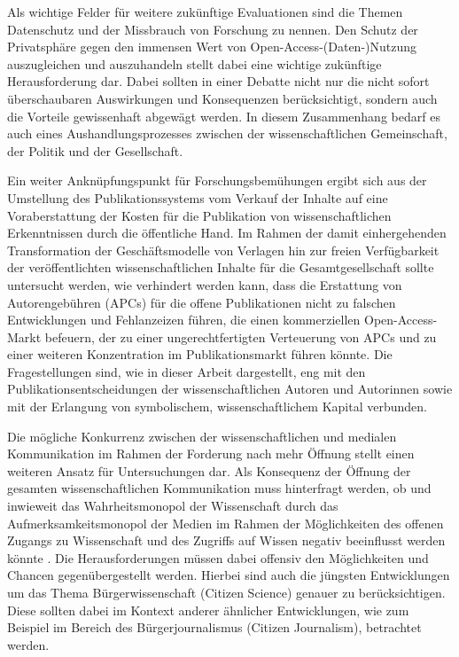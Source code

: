 Als wichtige Felder für weitere zukünftige Evaluationen sind die Themen Datenschutz und der Missbrauch von Forschung \cite{Fritsch_2015} zu nennen. Den Schutz der Privatsphäre gegen den immensen Wert von Open-Access-(Daten-)Nutzung auszugleichen und auszuhandeln stellt dabei eine wichtige zukünftige Herausforderung dar. Dabei sollten in einer Debatte nicht nur die nicht sofort überschaubaren Auswirkungen und Konsequenzen berücksichtigt, sondern auch die Vorteile gewissenhaft abgewägt werden. In diesem Zusammenhang bedarf es auch eines Aushandlungsprozesses zwischen der wissenschaftlichen Gemeinschaft, der Politik und der Gesellschaft.

Ein weiter Anknüpfungspunkt für Forschungsbemühungen ergibt sich aus der Umstellung des Publikationssystems vom Verkauf der Inhalte auf eine Voraberstattung der Kosten für die Publikation von wissenschaftlichen Erkenntnissen durch die öffentliche Hand. Im Rahmen der damit einhergehenden Transformation der Geschäftsmodelle von Verlagen hin zur freien Verfügbarkeit der veröffentlichten wissenschaftlichen Inhalte für die Gesamtgesellschaft sollte untersucht werden, wie verhindert werden kann, dass die Erstattung von Autorengebühren (APCs) für die offene Publikationen nicht zu falschen Entwicklungen und Fehlanzeizen führen, die einen kommerziellen Open-Access-Markt befeuern, der zu einer ungerechtfertigten Verteuerung von APCs und zu einer weiteren Konzentration im Publikationsmarkt führen könnte. Die Fragestellungen sind, wie in dieser Arbeit dargestellt, eng mit den Publikationsentscheidungen der wissenschaftlichen Autoren und Autorinnen sowie mit der Erlangung von symbolischem, wissenschaftlichem Kapital verbunden.

Die mögliche Konkurrenz zwischen der wissenschaftlichen und medialen Kommunikation im Rahmen der Forderung nach mehr Öffnung stellt einen weiteren Ansatz für Untersuchungen dar. Als Konsequenz der Öffnung der gesamten wissenschaftlichen Kommunikation muss hinterfragt werden, ob und inwieweit das Wahrheitsmonopol der Wissenschaft durch das Aufmerksamkeitsmonopol der Medien im Rahmen der Möglichkeiten des offenen Zugangs zu Wissenschaft und des Zugriffs auf Wissen negativ beeinflusst werden könnte \cite{Weingart_2005}. Die Herausforderungen müssen dabei offensiv den Möglichkeiten und Chancen gegenübergestellt werden. Hierbei sind auch die jüngsten Entwicklungen um das Thema Bürgerwissenschaft (Citizen Science) genauer zu berücksichtigen. Diese sollten dabei im Kontext anderer ähnlicher Entwicklungen, wie zum Beispiel im Bereich des Bürgerjournalismus (Citizen Journalism), betrachtet werden.

